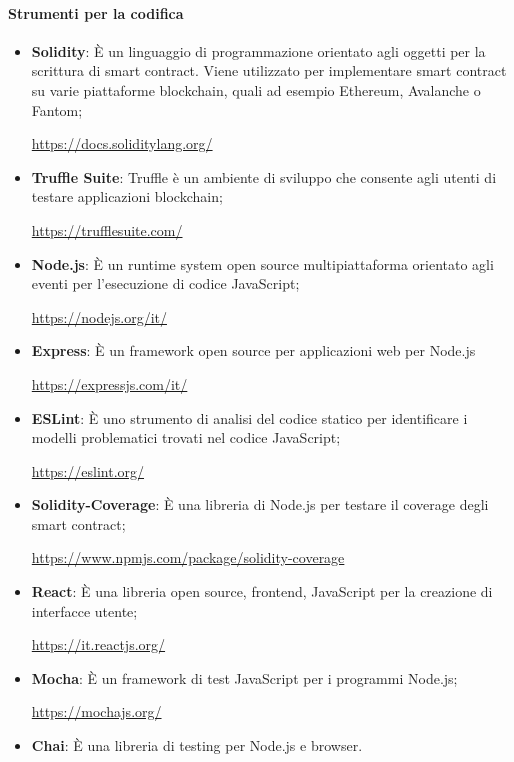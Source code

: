\paragraph{Strumenti per la codifica}
\begin{itemize}
    \item \textbf{Solidity}: È un linguaggio di programmazione orientato agli oggetti per la scrittura di smart contract\glo{}. Viene utilizzato per implementare smart contract\glo{} su varie piattaforme blockchain\glo{}, quali ad esempio Ethereum\glo{}, Avalanche\glo{} o Fantom\glo{};
          \begin{center}\url{https://docs.soliditylang.org/}\end{center}
    \item \textbf{Truffle Suite}:
          Truffle è un ambiente di sviluppo che consente agli utenti di testare applicazioni blockchain\glo{};
          \begin{center}\url{https://trufflesuite.com/}\end{center}
    \item \textbf{Node.js}: È un runtime system\glo{} open source\glo{} multipiattaforma orientato agli eventi per l'esecuzione di codice JavaScript\glo{};
          \begin{center}\url{https://nodejs.org/it/}\end{center}
    \item \textbf{Express}: È un framework\glo{} open source\glo{} per applicazioni web per Node.js
          \begin{center}\url{https://expressjs.com/it/}\end{center}
    \item \textbf{ESLint}: È uno strumento di analisi del codice statico per identificare i modelli problematici trovati nel codice JavaScript\glo{};
          \begin{center}\url{https://eslint.org/}\end{center}
    \item \textbf{Solidity-Coverage}: È una libreria di Node.js per testare il coverage degli smart contract\glo{};
          \begin{center}\url{https://www.npmjs.com/package/solidity-coverage}\end{center}
    \item \textbf{React}: È una libreria open source\glo{}, frontend\glo{}, JavaScript\glo{} per la creazione di interfacce utente;
          \begin{center}\url{https://it.reactjs.org/}\end{center}
    \item \textbf{Mocha}: È un framework di test JavaScript\glo{} per i programmi Node.js;
          \begin{center}\url{https://mochajs.org/}\end{center}
    \item \textbf{Chai}: È una libreria di testing per Node.js e browser.
          \begin{center}\url{}\end{center}
\end{itemize}
